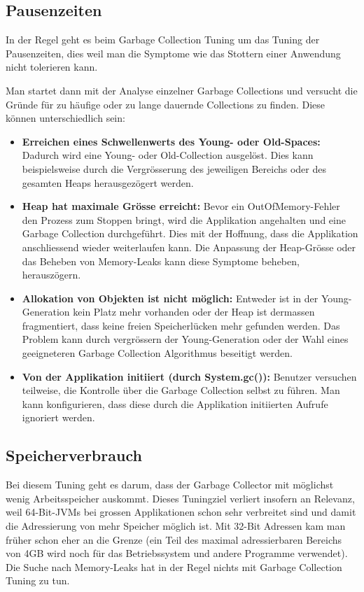 \subsection{Pausenzeiten\label{gc_tuning_pausenzeiten}}
In der Regel geht es beim Garbage Collection Tuning um das Tuning der Pausenzeiten, dies weil man die Symptome wie das Stottern einer Anwendung nicht tolerieren kann. 

Man startet dann mit der Analyse einzelner Garbage Collections und versucht die Gründe für zu häufige oder zu lange dauernde Collections zu finden. Diese können unterschiedlich sein:
\begin{itemize}
\item \textbf{Erreichen eines Schwellenwerts des Young- oder Old-Spaces:} Dadurch wird eine Young- oder Old-Collection ausgelöst. Dies kann beispielsweise durch die Vergrösserung des jeweiligen Bereichs oder des gesamten Heaps herausgezögert werden.
\item \textbf{Heap hat maximale Grösse erreicht:} Bevor ein OutOfMemory-Fehler den Prozess zum Stoppen bringt, wird die Applikation angehalten und eine Garbage Collection durchgeführt. Dies mit der Hoffnung, dass die Applikation anschliessend wieder weiterlaufen kann. Die Anpassung der Heap-Grösse oder das Beheben von Memory-Leaks kann diese Symptome beheben, herauszögern.
\item \textbf{Allokation von Objekten ist nicht möglich:} Entweder ist in der Young-Generation kein Platz mehr vorhanden oder der Heap ist dermassen fragmentiert, dass keine freien Speicherlücken mehr gefunden werden. Das Problem kann durch vergrössern der Young-Generation oder der Wahl eines geeigneteren Garbage Collection Algorithmus beseitigt werden.
\item \textbf{Von der Applikation initiiert (durch System.gc()):} Benutzer versuchen teilweise, die Kontrolle über die Garbage Collection selbst zu führen. Man kann konfigurieren, dass diese durch die Applikation initiierten Aufrufe ignoriert werden.
\end{itemize}



\subsection{Speicherverbrauch\label{gc_tuning_speicherverbrauch}}
Bei diesem Tuning geht es darum, dass der Garbage Collector mit möglichst wenig Arbeitsspeicher auskommt.
Dieses Tuningziel verliert insofern an Relevanz, weil 64-Bit-JVMs bei grossen Applikationen schon sehr verbreitet sind und damit die Adressierung von mehr Speicher möglich ist. Mit 32-Bit Adressen kam man früher schon eher an die Grenze (ein Teil des maximal adressierbaren Bereichs von 4GB wird noch für das Betriebssystem und andere Programme verwendet). Die Suche nach Memory-Leaks hat in der Regel nichts mit Garbage Collection Tuning zu tun.

